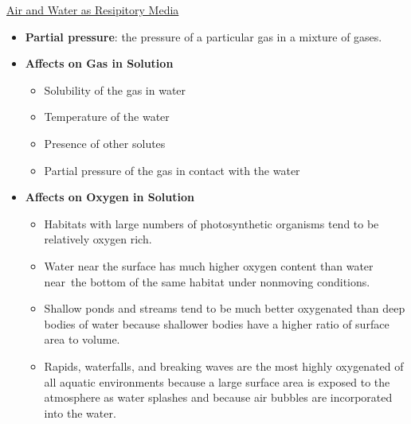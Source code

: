 \documentclass[12pt,letterpaper]{article}
\begin{document}
\hypertarget{42.2}{}
\begin{secbox}{\hyperlink{42}{Air and Water as Resipitory Media}}{
    \begin{itemize}
        \item \textbf{Partial pressure}: the pressure of a particular gas in a mixture of gases.
        \item \textbf{Affects on Gas in Solution}
        \begin{itemize}
            \item Solubility of the gas in water
            \item Temperature of the water
            \item Presence of other solutes
            \item Partial pressure of the gas in contact with the water
        \end{itemize}
        \item \textbf{Affects on Oxygen in Solution}
        \begin{itemize}
            \item Habitats with large numbers of photosynthetic organisms tend to be relatively oxygen rich.
            \item Water near the surface has much higher oxygen content than water near the bottom of the same habitat under nonmoving conditions. 
            \item Shallow ponds and streams tend to be much better oxygenated than deep bodies of water because shallower bodies have a higher ratio of surface area to volume.
            \item Rapids, waterfalls, and breaking waves are the most highly oxygenated of all aquatic environments because a large surface area is exposed to the atmosphere as water splashes and because air bubbles are incorporated into the water.
        \end{itemize}
    \end{itemize}
}\end{secbox}
\end{document}
